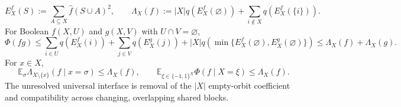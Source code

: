 \newcommand{\qpot}[1]{#1\log_2(1/#1)+2#1/\ln 2}
\[
E_X^f(S):=\sum_{A\subseteq X}\widehat f(S\cup A)^2,
\qquad
\Lambda_X(f):=|X|q(E_X^f(\varnothing))
 +\sum_{i\notin X}q(E_X^f(\{i\})).
\]
For Boolean $f(X,U)$ and $g(X,V)$ with $U\cap V=\varnothing$,
\[
\Phi(fg)\le
\sum_{i\in U}q(E_X^f(i))+\sum_{j\in V}q(E_X^g(j))
+|X|q\!\left(\min\{E_X^f(\varnothing),E_X^g(\varnothing)\}\right)
\le \Lambda_X(f)+\Lambda_X(g).
\]
For $x\in X$,
\[
\mathbb E_{\sigma}\Lambda_{X\setminus\{x\}}(f\mid x=\sigma)
\le\Lambda_X(f),
\qquad
\mathbb E_{\xi\in\{-1,1\}^X}\Phi(f\mid X=\xi)
\le\Lambda_X(f).
\]
The unresolved universal interface is removal of the $|X|$ empty-orbit
coefficient and compatibility across changing, overlapping shared blocks.

